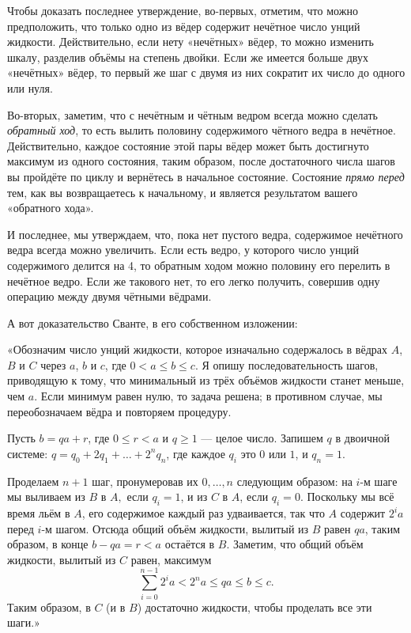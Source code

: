 Чтобы доказать последнее утверждение, во-первых, отметим, что можно предположить, что только одно из вёдер содержит нечётное число унций жидкости.
Действительно, если нету «нечётных» вёдер, то можно изменить шкалу, разделив объёмы на степень двойки.
Если же имеется больше двух «нечётных» вёдер, то первый же шаг с двумя из них сократит их число до одного или нуля.

Во-вторых, заметим, что с нечётным и чётным ведром всегда можно сделать \emph{обратный ход}, то есть вылить половину содержимого чётного ведра в нечётное.
Действительно, каждое состояние этой пары вёдер может быть достигнуто максимум из одного состояния, таким образом, после достаточного числа шагов вы пройдёте по циклу и вернётесь в начальное состояние.
Состояние \emph{прямо перед} тем, как вы возвращаетесь к начальному, и является результатом вашего «обратного хода».

И последнее, мы утверждаем, что, пока нет пустого ведра, содержимое нечётного ведра всегда можно увеличить.
Если есть ведро, у которого число унций содержимого делится на 4, то обратным ходом можно половину его перелить в нечётное ведро.
Если же такового нет, то его легко получить, совершив одну операцию между двумя чётными вёдрами.
\heart

А вот доказательство Сванте, в его собственном изложении:

\medskip

«Обозначим число унций жидкости, которое изначально содержалось в вёдрах $A$, $B$ и $C$ через $a$, $b$ и $c$, где $0<a\le b\le c$.
Я опишу последовательность шагов, приводящую к тому, что минимальный из трёх объёмов жидкости станет меньше, чем $a$.
Если минимум равен нулю, то задача решена; в противном случае, мы переобозначаем вёдра и повторяем процедуру.

Пусть $b = qa + r$, где $0\le r<a$ и $q\ge 1$ --- целое число.
Запишем $q$ в двоичной системе: $q=q_0+2q_1+\dots+2^nq_n$, где каждое $q_i$ это $0$ или $1$, и $q_n = 1$.

Проделаем $n+1$ шаг, пронумеровав их $0,\dots, n$ следующим образом: на $i$-м шаге  мы выливаем из $B$ в $A,$ если $q_i = 1$, и из $C$ в $A$, если $q_i = 0$.
Поскольку мы всё время льём в $A$, его содержимое каждый раз удваивается, так что $A$ содержит $2^ia$ перед $i$-м шагом.
Отсюда общий объём жидкости, вылитый из $B$ равен $qa$, таким образом, в конце $b-qa=r<a$ остаётся в $B$.
Заметим, что общий объём жидкости, вылитый из $C$ равен, максимум
\[\sum_{i=0}^{n-1} 2^ia<2^na\le qa\le b\le c.\]
Таким образом, в $C$ (и в $B$) достаточно жидкости, чтобы проделать все эти шаги.»
\heart


